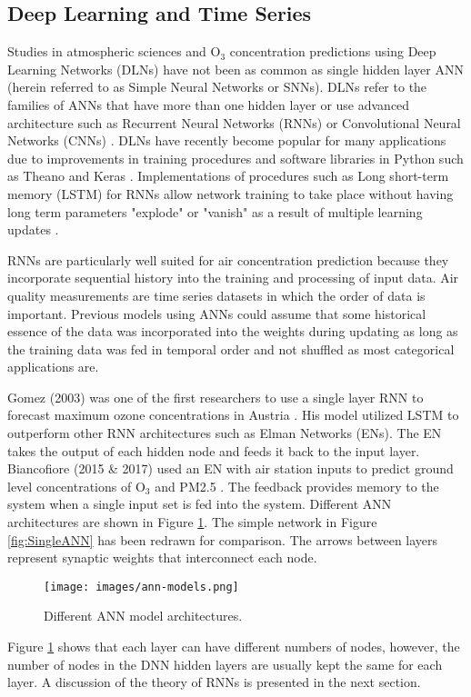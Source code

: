 \documentclass[preprint,12pt,authoryear]{elsarticle}
\begin{document}
\begin{linenumbers}

\subsection{Deep Learning and Time Series}
Studies in atmospheric sciences and O$_{3}$ concentration predictions using Deep Learning Networks (DLNs) have not been as common as single hidden layer ANN (herein referred to as Simple Neural Networks or SNNs). DLNs refer to the families of ANNs that have more than one hidden layer or use advanced architecture such as Recurrent Neural Networks (RNNs) or Convolutional Neural Networks (CNNs) \citep{Goodfellow2016}. DLNs have recently become popular for many applications due to improvements in training procedures and software libraries in Python such as Theano \citep{Theano2016} and Keras \citep{keras2015}. Implementations of procedures such as Long short-term memory (LSTM) for RNNs allow network training to take place without having long term parameters "explode" or "vanish" as a result of multiple learning updates \citep{Pascanu2013}.

RNNs are particularly well suited for air concentration prediction because they incorporate sequential history into the training and processing of input data. Air quality measurements are time series datasets in which the order of data is important. Previous models using ANNs could assume that some historical essence of the data was incorporated into the weights during updating as long as the training data was fed in temporal order and not shuffled as most categorical applications are.

Gomez (2003) was one of the first researchers to use a single layer RNN to forecast maximum ozone concentrations in Austria \citep{Gomez2003}. His model utilized LSTM to outperform other RNN architectures such as Elman Networks (ENs). The EN takes the output of each hidden node and feeds it back to the input layer. Biancofiore (2015 \& 2017) used an EN with air station inputs to predict ground level concentrations of O$_{3}$ \citep{Biancofiore2015} and PM2.5 \citep{Biancofiore2017}. The feedback provides memory to the system when a single input set is fed into the system. Different ANN architectures are shown in Figure \ref{fig:ANNmodels}. The simple network in Figure \ref{fig:SingleANN} has been redrawn for comparison.  The arrows between layers represent synaptic weights that interconnect each node.
%
\begin{figure}[H]
\centering
\texttt{[image: images/ann-models.png]} 
\caption{Different ANN model architectures.}
\label{fig:ANNmodels}
\end{figure}
%
Figure \ref{fig:ANNmodels} shows that each layer can have different numbers of nodes, however, the number of nodes in the DNN hidden layers are usually kept the same for each layer. A discussion of the theory of RNNs is presented in the next section.


\end{linenumbers}
\end{document}
